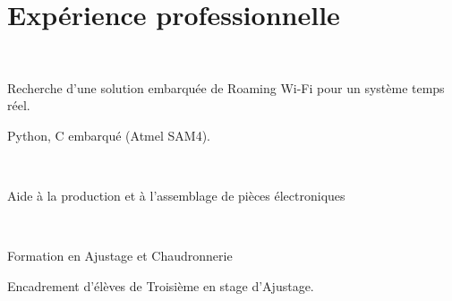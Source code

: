 \documentclass[]{cv-template}
\begin{document}
\begin{minipage}[t]{0.65\textwidth} 

\section{Expérience professionnelle}

\\
\vspace{0.9em} %
\begin{tightemize}
\item Recherche d'une solution embarquée de Roaming Wi-Fi pour un système temps réel.
\item Python, C embarqué (Atmel SAM4).
\end{tightemize}
\sectionsep

 \\
\begin{tightemize}
\item Aide à la production et à l'assemblage de pièces électroniques
\end{tightemize}
\sectionsep

 \\
\begin{tightemize}
\item Formation en Ajustage et Chaudronnerie
\item Encadrement d'élèves de Troisième en stage d'Ajustage.
\end{tightemize}
\sectionsep



\end{minipage}
\end{document}
